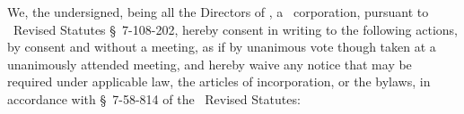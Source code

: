 
\bigskip

We, the undersigned, being all the Directors of \companyName, a \companyState\ corporation,
pursuant to \companyState\ Revised Statutes \S~7-108-202, hereby consent in writing to the
following actions, by consent and without a meeting, as if by unanimous vote though taken at a
unanimously attended meeting, and hereby waive any notice that may be required under applicable
law, the articles of incorporation, or the bylaws, in accordance with \S~7-58-814 of the
\companyState\ Revised Statutes:

